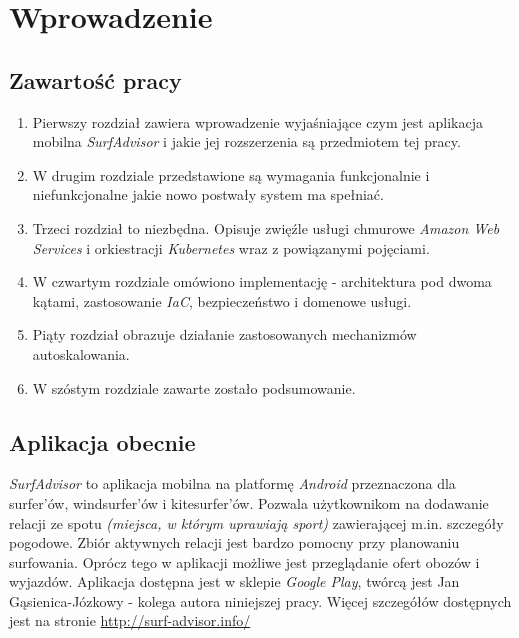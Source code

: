 \chapter{Wprowadzenie}
\label{cha:intro}

\section{Zawartość pracy}
\begin{enumerate}
    \item
    Pierwszy rozdział zawiera wprowadzenie wyjaśniające czym jest aplikacja mobilna \emph{SurfAdvisor} i jakie jej rozszerzenia są przedmiotem tej pracy.

    \item
    W drugim rozdziale przedstawione są wymagania funkcjonalnie i niefunkcjonalne jakie nowo postwały system ma spełniać.

    \item
    Trzeci rozdział to niezbędna. Opisuje zwięźle usługi chmurowe \emph{Amazon Web Services} i orkiestracji \emph{Kubernetes} wraz z powiązanymi pojęciami.

    \item
    W czwartym rozdziale omówiono implementację - architektura pod dwoma kątami, zastosowanie \emph{IaC}, bezpieczeństwo i domenowe usługi.

    \item
    Piąty rozdział obrazuje działanie zastosowanych mechanizmów autoskalowania.

    \item
    W szóstym rozdziale zawarte zostało podsumowanie.
\end{enumerate} 


\section{Aplikacja obecnie}
\emph{SurfAdvisor} to aplikacja mobilna na platformę \emph{Android} przeznaczona dla surfer'ów, windsurfer'ów i kitesurfer'ów.
Pozwala użytkownikom na dodawanie relacji ze spotu \emph{(miejsca, w którym uprawiają sport)} zawierającej m.in. szczegóły pogodowe.
Zbiór aktywnych relacji jest bardzo pomocny przy planowaniu surfowania. Oprócz tego w aplikacji możliwe jest przeglądanie ofert obozów i wyjazdów.
Aplikacja dostępna jest w sklepie \emph{Google Play}, twórcą jest Jan Gąsienica-Józkowy - kolega autora niniejszej pracy.
Więcej szczegółów dostępnych jest na stronie \url{http://surf-advisor.info/}


